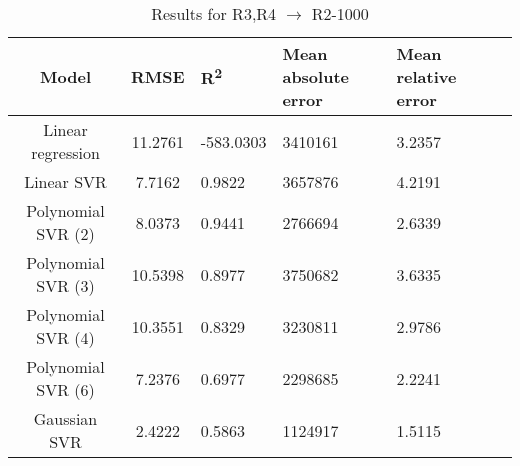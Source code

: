\begin{table}[H]
\centering
\begin{adjustbox}{center}
\begin{tabular}{c | c M{1.2cm} M{2.5cm} M{2.5cm} M{1.8cm}}
Model & RMSE & R\textsuperscript{2} & Mean absolute error & Mean relative error \tabularnewline
\hline
Linear regression & 11.2761 & -583.0303 & 3410161 & 3.2357 \\
Linear SVR & 7.7162 & 0.9822 & 3657876 & 4.2191 \\
Polynomial SVR (2) & 8.0373 & 0.9441 & 2766694 & 2.6339 \\
Polynomial SVR (3) & 10.5398 & 0.8977 & 3750682 & 3.6335 \\
Polynomial SVR (4) & 10.3551 & 0.8329 & 3230811 & 2.9786 \\
Polynomial SVR (6) & 7.2376 & 0.6977 & 2298685 & 2.2241 \\
Gaussian SVR & 2.4222 & 0.5863 & 1124917 & 1.5115 \\
\end{tabular}
\end{adjustbox}
\\
\caption{Results for R3,R4 $\rightarrow$ R2-1000}
\label{tab:coreonly_linear_R3,R4_R2_1000}
\end{table}
